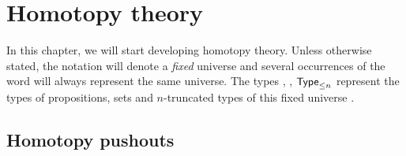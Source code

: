 
\newcommand{\typele}[1]{\ensuremath{\type_{\le #1}}\xspace}
\newcommand{\N}{\mathbb{N}}
\newcommand{\Nt}{\N_{-2}}
\newcommand{\function}[4]{\left\{\begin{array}{rcl}#1 &
      \longrightarrow & #2 \\ #3 & \longmapsto & #4 \end{array}\right.}
\newcommand{\anhprop}{a mere proposition\xspace}
\newcommand{\hprops}{mere propositions\xspace}
\newcommand{\funext}{\mathsf{funext}}
\newcommand{\happly}{\mathsf{happly}}


\renewcommand{\P}{\ensuremath{\mathsf{P}}\xspace}
\newcommand{\cocone}[2]{\mathrm{cocone}_{#1}(#2)}
\newcommand{\Ddiag}{\mathscr{D}}
\newcommand{\inl}{\mathsf{inl}}
\newcommand{\inr}{\mathsf{inr}}
\newcommand{\glue}{\mathsf{glue}}
\newcommand{\cone}[2]{\mathrm{cone}_{#1}(#2)}
\newcommand{\reflect}{\mathsf{r}}
\newcommand{\project}{\mathsf{p}}
\newcommand{\ext}{\mathsf{ext}}
\newcommand{\tproj}{\mathsf{proj}}
\newcommand{\extendsmb}{\mathsf{extend}}
\newcommand{\extend}[1]{\extendsmb(#1)}
\newcommand{\composecocone}[2]{#1\circ#2}
\newcommand{\composecone}[2]{#2\circ#1}
\newcommand{\Sn}{\mathbb{S}}

\chapter{Homotopy theory}
\label{cha:homotopy}

In this chapter, we will start developing homotopy theory. Unless otherwise
stated, the notation \type will denote a \emph{fixed} universe and several
occurrences of the word \type will always represent the same universe. The types
\prop, \set, \typele{n} represent the types of propositions, sets and
$n$-truncated types of this fixed universe \type.

\section{Homotopy pushouts}
\label{sec:pushouts}


